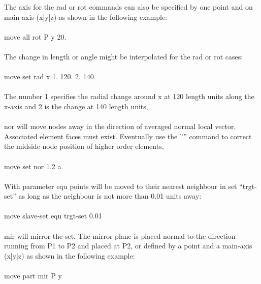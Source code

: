 \documentclass{article}
\begin{document}
The axis for the rad or rot commands can also be specified by one point and on main-axis (x|y|z) as shown in the following example:\\\\
move all rot P y 20.\\\\
The change in length or angle might be interpolated for the rad or rot cases:\\\\
move set rad x 1. 120. 2. 140.\\\\
The number 1 specifies the radial change around x at 120 length units along the x-axis and 2 is the change at 140 length units,\\\\
nor will move nodes away in the direction of averaged normal local vector. Associated element faces must exist. Eventually use the '''' command to correct the midside node position of higher order elements,\\\\
move set nor 1.2 a\\\\
With parameter equ points will be moved to their nearest neighbour in set ``trgt-set'' as long as the neighbour is not more than 0.01 units away:\\\\
move slave-set equ trgt-set 0.01\\\\
mir will mirror the set. The mirror-plane is placed normal to the direction running from P1 to P2 and placed at P2, or defined by a point and a main-axis (x|y|z) as shown in the following example:\\\\
move part mir P y
\end{document}
